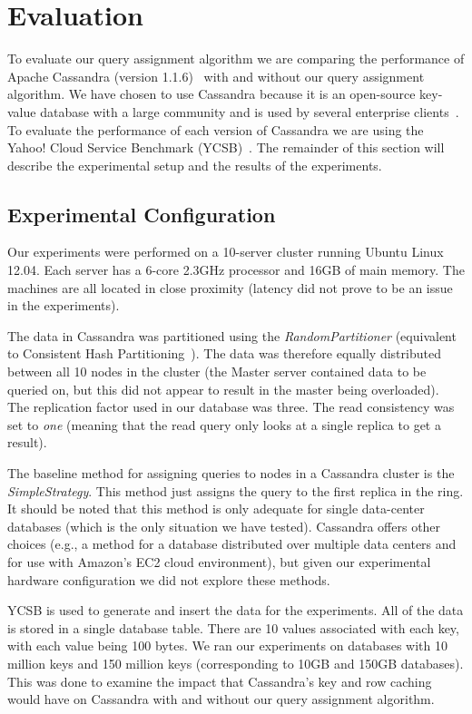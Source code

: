 \section{Evaluation}
\label{sec:experiments}
To evaluate our query assignment algorithm we are comparing the performance of Apache Cassandra (version 1.1.6)~\cite{Lakshman:2010:CDS:1773912.1773922} with and without our query assignment algorithm. We have chosen to use Cassandra because it is an open-source key-value database with a large community and is used by several enterprise clients~\cite{DataStaxCassandra}. To evaluate the performance of each version of Cassandra we are using the Yahoo! Cloud Service Benchmark (YCSB)~\cite{Cooper:2010:BCS:1807128.1807152}. The remainder of this section will describe the experimental setup and the results of the experiments.

\subsection{Experimental Configuration}
Our experiments were performed on a 10-server cluster running Ubuntu Linux 12.04. Each server has a 6-core 2.3GHz processor and 16GB of main memory. The machines are all located in close proximity (latency did not prove to be an issue in the experiments).

The data in Cassandra was partitioned using the \textit{RandomPartitioner} (equivalent to Consistent Hash Partitioning~\cite{consistentHashPartitioning}). The data was therefore equally distributed between all 10 nodes in the cluster (the Master server contained data to be queried on, but this did not appear to result in the master being overloaded). The replication factor used in our database was three. The read consistency was set to \textit{one} (meaning that the read query only looks at a single replica to get a result).

The baseline method for assigning queries to nodes in a Cassandra cluster is the \textit{SimpleStrategy}. This method just assigns the query to the first replica in the ring. It should be noted that this method is only adequate for single data-center databases (which is the only situation we have tested). Cassandra offers other choices (e.g., a method for a database distributed over multiple data centers and for use with Amazon's EC2 cloud environment), but given our experimental hardware configuration we did not explore these methods.

YCSB is used to generate and insert the data for the experiments. All of the data is stored in a single database table. There are 10 values associated with each key, with each value being 100 bytes. We ran our experiments on databases with 10 million keys and 150 million keys (corresponding to 10GB and 150GB databases). This was done to examine the impact that Cassandra's key and row caching would have on Cassandra with and without our query assignment algorithm.

